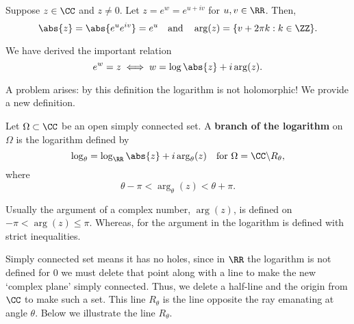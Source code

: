 \documentclass[12pt, a4paper]{article}
\begin{document}
Suppose \(z \in \CC\) and \(z\neq 0\). Let \(z = e^w = e^{u+iv}\) for \(u,v \in \RR\). Then,
\[\abs{z} = \abs{e^u e^{iv}}=e^u \quad \text{and} \quad \arg(z)=\{v+2\pi k : k \in \ZZ\}.\]

We have derived the important relation 
\[e^w =z \iff w = \log\abs{z}+i\arg(z).\]

A problem arises: by this definition the logarithm is not holomorphic! We provide a new definition.

\begin{definition}
    Let \(\Omega \subset \CC\) be an open simply connected set. A \textbf{branch of the logarithm} on \(\Omega\) is the logarithm defined by 
    \[\log_{\theta} = \log_{\RR}\abs{z} + i\arg_{\theta}(z) \quad \text{for } \Omega=\CC \backslash R_{\theta},\]
    where
    \[\theta-\pi < \arg_{\theta}(z) < \theta+\pi.\]
\end{definition}

\begin{mdremark}
    Usually the argument of a complex number, \(\arg(z)\), is defined on \(-\pi < \arg(z) \leq \pi\). Whereas, for the argument in the logarithm is defined with strict inequalities.
\end{mdremark}

\begin{mdremark}
    Simply connected set means it has no holes, since in \(\RR\) the logarithm is not defined for \(0\) we must delete that point along with a line to make the new `complex plane' simply connected. Thus, we delete a half-line and the origin from \(\CC\) to make such a set. This line \(R_{\theta}\) is the line opposite the ray emanating at angle \(\theta\). Below we illustrate the line \(R_{\theta}\).
    \begin{figure}[H]
         \begin{center}
         \end{center}
    \end{figure}
\end{mdremark}
\end{document}
